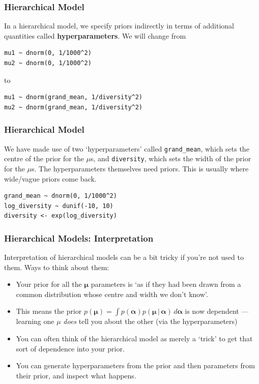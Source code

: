 \documentclass{beamer}
\newcommand{\given}{\,|\,}
\newcommand{\balpha}{\boldsymbol{\alpha}}
\newcommand{\bmu}{\boldsymbol{\mu}}
\begin{document}
\begin{frame}[fragile]
\frametitle{Hierarchical Model}
In a hierarchical model, we specify priors indirectly in terms of additional
quantities called {\bf hyperparameters}. We will change from
\begin{verbatim}
mu1 ~ dnorm(0, 1/1000^2)
mu2 ~ dnorm(0, 1/1000^2)
\end{verbatim}
\pause
to
\begin{verbatim}
mu1 ~ dnorm(grand_mean, 1/diversity^2)
mu2 ~ dnorm(grand_mean, 1/diversity^2)
\end{verbatim}

\end{frame}

\begin{frame}[fragile]
\frametitle{Hierarchical Model}
We have made use of two `hyperparameters' called \texttt{grand_mean},
which sets the centre of the prior for the $\mu$s, and \texttt{diversity},
which sets the width of the prior for the $\mu$s. The hyperparameters
themselves need priors. This is usually where wide/vague priors come back.\\[0.5em]

\begin{verbatim}
grand_mean ~ dnorm(0, 1/1000^2)
log_diversity ~ dunif(-10, 10)
diversity <- exp(log_diversity)
\end{verbatim}

\end{frame}

\begin{frame}[fragile]
\frametitle{Hierarchical Models: Interpretation}
\footnotesize
Interpretation of hierarchical models can be a bit tricky if you're not used
to them. Ways to think about them: \pause
\begin{itemize}
\item Your prior for all the $\bmu$ parameters is `as if they had been
      drawn from a common distribution
      whose centre and width we don't know'.\pause
\item This means the prior $p(\bmu) = \int p(\balpha) p(\bmu \given \balpha) \, d\balpha$
      is now dependent --- learning one $\mu$ {\em does} tell you about the
      other (via the hyperparameters)\pause
\item You can often think of the hierarchical model as merely a `trick' to
      get that sort of dependence into your prior.\pause
\item You can generate hyperparameters from the prior and then parameters
      from their prior, and inspect what happens.
\end{itemize}

\end{frame}
\end{document}
